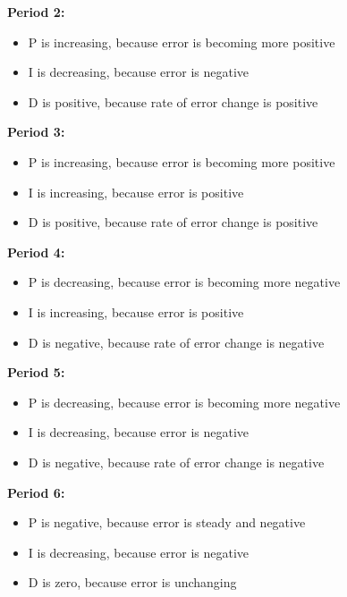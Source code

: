{\bf Period 2:}
 

\begin{itemize}
\item{}P is increasing, because error is becoming more positive
\item{}I is decreasing, because error is negative
\item{}D is positive, because rate of error change is positive
\end{itemize} 
\bigskip 
 

{\bf Period 3:}
 

\begin{itemize}
\item{}P is increasing, because error is becoming more positive
\item{}I is increasing, because error is positive
\item{}D is positive, because rate of error change is positive
\end{itemize} 
\bigskip 
 

{\bf Period 4:}
 

\begin{itemize}
\item{}P is decreasing, because error is becoming more negative
\item{}I is increasing, because error is positive
\item{}D is negative, because rate of error change is negative
\end{itemize} 
\bigskip 
 

{\bf Period 5:}
 

\begin{itemize}
\item{}P is decreasing, because error is becoming more negative
\item{}I is decreasing, because error is negative
\item{}D is negative, because rate of error change is negative
\end{itemize} 
\bigskip 
 

{\bf Period 6:}
 

\begin{itemize}
\item{}P is negative, because error is steady and negative
\item{}I is decreasing, because error is negative
\item{}D is zero, because error is unchanging
\end{itemize} 



